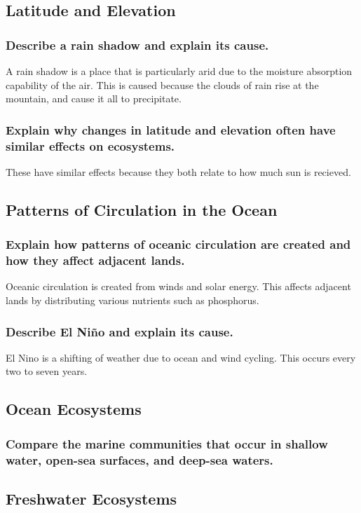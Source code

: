 \documentclass[a4paper]{article}
\begin{document}
\subsection{Latitude and Elevation}
\subsubsection{Describe a rain shadow and explain its cause.}
A rain shadow is a place that is particularly arid due to the moisture absorption capability of the air. This is caused because the 
clouds of rain rise at the mountain, and cause it all to precipitate.

\subsubsection{Explain why changes in latitude and elevation often have similar effects on ecosystems.}
These have similar effects because they both relate to how much sun is recieved.

\subsection{Patterns of Circulation in the Ocean}
\subsubsection{Explain how patterns of oceanic circulation are created and how they affect adjacent lands.}
Oceanic circulation is created from winds and solar energy. This affects adjacent lands by distributing various nutrients such as phosphorus.


\subsubsection{Describe El Niño and explain its cause.}
El Nino is a shifting of weather due to ocean and wind cycling. This occurs every two to seven years.

\subsection{Ocean Ecosystems}
\subsubsection{Compare the marine communities that occur in shallow water, open-sea surfaces, and deep-sea waters.}

\subsection{Freshwater Ecosystems}
\end{document}
